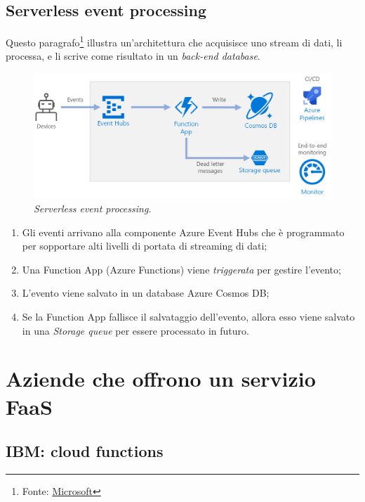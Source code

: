 \documentclass[a4paper]{article}
\begin{document}
	\subsection{Serverless event processing}
	
	Questo paragrafo\footnote{Fonte: \href{https://learn.microsoft.com/en-us/azure/architecture/reference-architectures/serverless/event-processing}{Microsoft}} illustra un'architettura che acquisisce uno stream di dati, li processa, e li scrive come risultato in un \emph{back-end database}.
	\begin{figure}[!htp]
		\centering
		\includegraphics[width=\textwidth]{img/serverless-event-processing.png}
		\caption{\emph{Serverless event processing.}}
	\end{figure}
	
	\begin{enumerate}
		\item Gli eventi arrivano alla componente Azure Event Hubs che è programmato per sopportare alti livelli di portata di streaming di dati;
		
		\item Una Function App (Azure Functions) viene \emph{triggerata} per gestire l'evento;
		
		\item L'evento viene salvato in un database Azure Cosmos DB;
		
		\item Se la Function App fallisce il salvataggio dell'evento, allora esso viene salvato in una \emph{Storage queue} per essere processato in futuro.
	\end{enumerate}\newpage
	
	\section{Aziende che offrono un servizio FaaS}
	
	\subsection{IBM: cloud functions}
	
\end{document}
